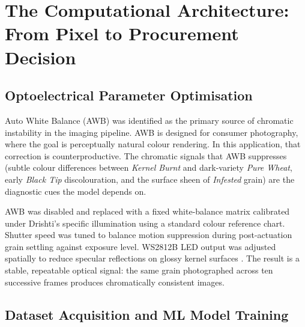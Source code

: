 
\chapter{The Computational Architecture: From Pixel to Procurement Decision}\doublespacing
\label{Chapter6}

\section{Optoelectrical Parameter Optimisation}

Auto White Balance (AWB) was identified as the primary source of chromatic instability in the imaging pipeline. AWB is designed for consumer photography, where the goal is perceptually natural colour rendering. In this application, that correction is counterproductive. The chromatic signals that AWB suppresses (subtle colour differences between \textit{Kernel Burnt} and dark-variety \textit{Pure Wheat}, early \textit{Black Tip} discolouration, and the surface sheen of \textit{Infested} grain) are the diagnostic cues the model depends on.

AWB was disabled and replaced with a fixed white-balance matrix calibrated under Drishti's specific illumination using a standard colour reference chart. Shutter speed was tuned to balance motion suppression during post-actuation grain settling against exposure level. WS2812B LED output was adjusted spatially to reduce specular reflections on glossy kernel surfaces \cite{LiWheat2024, ElMasry2019}. The result is a stable, repeatable optical signal: the same grain photographed across ten successive frames produces chromatically consistent images.

\section{Dataset Acquisition and ML Model Training}


